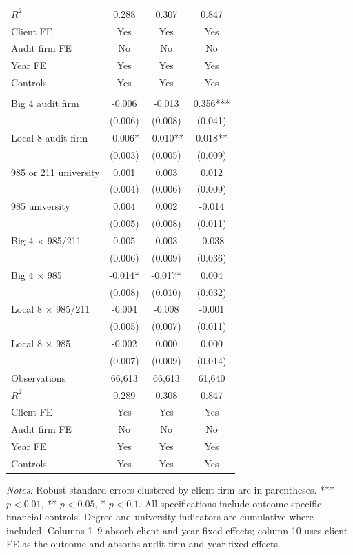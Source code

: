 \documentclass[10pt]{article}
\begin{document}
\begin{minipage}{19cm}
\begin{threeparttable}
\begin{tabular}{p{}ccc}
$R^{2}$ & 0.288 & 0.307 & 0.847 \\
Client FE & Yes & Yes & Yes \\
Audit firm FE & No & No & No \\
Year FE & Yes & Yes & Yes \\
Controls & Yes & Yes & Yes \\
\addlinespace
\multicolumn{4}{l}{\textbf{Panel B: Cumulative university tiers (base: neither 985 nor 211)}} \\
Big 4 audit firm & -0.006 & -0.013 & 0.356*** \\
 & (0.006) & (0.008) & (0.041) \\
Local 8 audit firm & -0.006* & -0.010** & 0.018** \\
 & (0.003) & (0.005) & (0.009) \\
985 or 211 university & 0.001 & 0.003 & 0.012 \\
 & (0.004) & (0.006) & (0.009) \\
985 university & 0.004 & 0.002 & -0.014 \\
 & (0.005) & (0.008) & (0.011) \\
Big 4 $\times$ 985/211 & 0.005 & 0.003 & -0.038 \\
 & (0.006) & (0.009) & (0.036) \\
Big 4 $\times$ 985 & -0.014* & -0.017* & 0.004 \\
 & (0.008) & (0.010) & (0.032) \\
Local 8 $\times$ 985/211 & -0.004 & -0.008 & -0.001 \\
 & (0.005) & (0.007) & (0.011) \\
Local 8 $\times$ 985 & -0.002 & 0.000 & 0.000 \\
 & (0.007) & (0.009) & (0.014) \\
Observations & 66,613 & 66,613 & 61,640 \\
$R^{2}$ & 0.289 & 0.308 & 0.847 \\
Client FE & Yes & Yes & Yes \\
Audit firm FE & No & No & No \\
Year FE & Yes & Yes & Yes \\
Controls & Yes & Yes & Yes \\
\bottomrule
\end{tabular}
\begin{tablenotes}\fontsize{9}{11}\selectfont
\item \raggedright \fontsize{9}{11}\selectfont \textit{Notes:} Robust standard errors clustered by client firm are in parentheses. *** $p<0.01$, ** $p<0.05$, * $p<0.1$. All specifications include outcome-specific financial controls. Degree and university indicators are cumulative where included.
Columns 1--9 absorb client and year fixed effects; column 10 uses client FE as the outcome and absorbs audit firm and year fixed effects.
\end{tablenotes}
\end{threeparttable}

\end{minipage}
\end{document}
